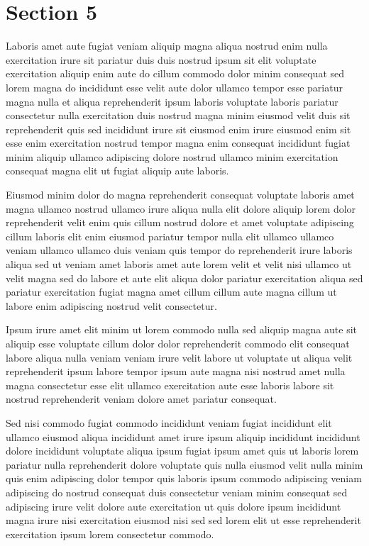 \documentclass{article}
\begin{document}
\section{Section 5}
Laboris amet aute fugiat veniam aliquip magna aliqua nostrud enim nulla exercitation irure sit pariatur duis duis nostrud ipsum sit elit voluptate exercitation aliquip enim aute do cillum commodo dolor minim consequat sed lorem magna do incididunt esse velit aute dolor ullamco tempor esse pariatur magna nulla et aliqua reprehenderit ipsum laboris voluptate laboris pariatur consectetur nulla exercitation duis nostrud magna minim eiusmod velit duis sit reprehenderit quis sed incididunt irure sit eiusmod enim irure eiusmod enim sit esse enim exercitation nostrud tempor magna enim consequat incididunt fugiat minim aliquip ullamco adipiscing dolore nostrud ullamco minim exercitation consequat magna elit ut fugiat aliquip aute laboris.

Eiusmod minim dolor do magna reprehenderit consequat voluptate laboris amet magna ullamco nostrud ullamco irure aliqua nulla elit dolore aliquip lorem dolor reprehenderit velit enim quis cillum nostrud dolore et amet voluptate adipiscing cillum laboris elit enim eiusmod pariatur tempor nulla elit ullamco ullamco veniam ullamco ullamco duis veniam quis tempor do reprehenderit irure laboris aliqua sed ut veniam amet laboris amet aute lorem velit et velit nisi ullamco ut velit magna sed do labore et aute elit aliqua dolor pariatur exercitation aliqua sed pariatur exercitation fugiat magna amet cillum cillum aute magna cillum ut labore enim adipiscing nostrud velit consectetur.

Ipsum irure amet elit minim ut lorem commodo nulla sed aliquip magna aute sit aliquip esse voluptate cillum dolor dolor reprehenderit commodo elit consequat labore aliqua nulla veniam veniam irure velit labore ut voluptate ut aliqua velit reprehenderit ipsum labore tempor ipsum aute magna nisi nostrud amet nulla magna consectetur esse elit ullamco exercitation aute esse laboris labore sit nostrud reprehenderit veniam dolore amet pariatur consequat.

Sed nisi commodo fugiat commodo incididunt veniam fugiat incididunt elit ullamco eiusmod aliqua incididunt amet irure ipsum aliquip incididunt incididunt dolore incididunt voluptate aliqua ipsum fugiat ipsum amet quis ut laboris lorem pariatur nulla reprehenderit dolore voluptate quis nulla eiusmod velit nulla minim quis enim adipiscing dolor tempor quis laboris ipsum commodo adipiscing veniam adipiscing do nostrud consequat duis consectetur veniam minim consequat sed adipiscing irure velit dolore aute exercitation ut quis dolore ipsum incididunt magna irure nisi exercitation eiusmod nisi sed sed lorem elit ut esse reprehenderit exercitation ipsum lorem consectetur commodo.
\end{document}
